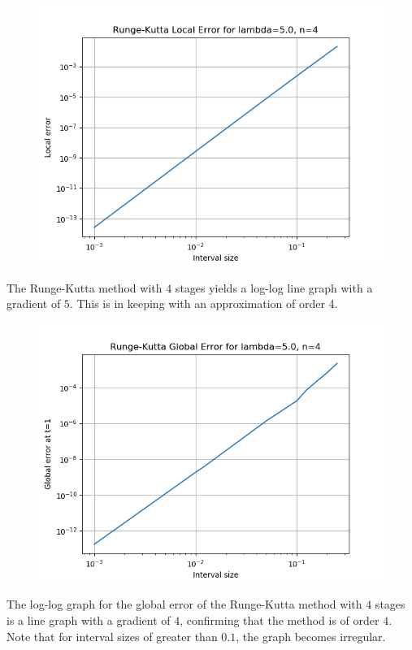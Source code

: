 \documentclass{article}
\begin{document}
\begin{figure}[H]
	\includegraphics[scale=0.6]{RK4_5_loglog}
\end{figure}
The Runge-Kutta method with $4$ stages yields a log-log line graph with a
gradient of $5$.  This is in keeping with an approximation of order 4.
\begin{figure}[H]
	\includegraphics[scale=0.6]{RK4_5_loglog_global}
\end{figure}
The log-log graph for the global error of the Runge-Kutta method with $4$
stages is a line graph with a gradient of $4$, confirming that the method is of
order $4$. Note that for interval sizes of greater than $0.1$, the graph becomes
irregular.
\end{document}
